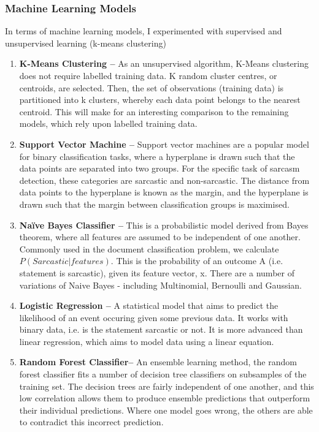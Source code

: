 \documentclass[12pt,a4paper]{article}
\begin{document}
\subsubsection{Machine Learning Models}
In terms of machine learning models, I experimented with supervised and unsupervised learning (k-means clustering)

\begin{enumerate}
	\item \textbf{K-Means Clustering --} As an unsupervised algorithm, K-Means clustering does not require labelled training data. K random cluster centres, or centroids, are selected. Then, the set of observations (training data) is partitioned into k clusters, whereby each data point belongs to the nearest centroid. This will make for an interesting comparison to the remaining models, which rely upon labelled training data.
	
	\item \textbf{Support Vector Machine --} Support vector machines are a popular model for binary classification tasks, where a hyperplane is drawn such that the data points are separated into two groups. For the specific task of sarcasm detection, these categories are sarcastic and non-sarcastic. The distance from data points to the hyperplane is known as the margin, and  the hyperplane is drawn such that the margin between classification groups is maximised.
	
	\item \textbf{Na\"{i}ve Bayes Classifier --} This is a probabilistic model derived from Bayes theorem, where all features are assumed to be independent of one another. Commonly used in the document classification problem, we calculate ${P(Sarcastic | features)}$. This is  the probability of an outcome A (i.e. statement is sarcastic), given its feature vector, x. There are a number of variations of Naive Bayes - including Multinomial, Bernoulli and Gaussian. 

	\item \textbf{Logistic Regression --} A statistical model that aims to predict the likelihood of an event occuring given some previous data. It works with binary data, i.e. is the statement sarcastic or not. It is more advanced than linear regression, which aims to model data using a linear equation.

	\item \textbf{Random Forest Classifier--}
	An ensemble learning method, the random forest classifier fits a number of decision tree classifiers on subsamples of the training set. The decision trees are fairly independent of one another, and this low correlation allows them to produce ensemble predictions that outperform their individual predictions. Where one model goes wrong, the others are able to contradict this incorrect prediction.
\end{enumerate}
\end{document}
